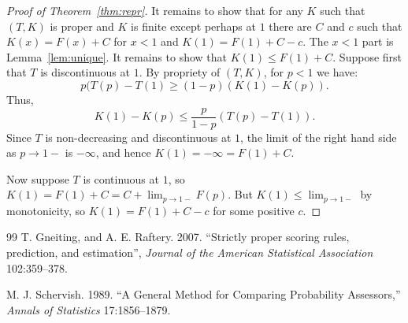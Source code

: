 \documentclass[11pt]{amsart} %
\begin{document}
\begin{proof}[Proof of Theorem~\ref{thm:repr}]
It remains to show that for any $K$ such that $(T,K)$ is proper and $K$ is finite except perhaps at $1$
there are $C$ and $c$ such that $K(x)=F(x)+C$ for $x<1$ and $K(1)=F(1)+C-c$. The $x<1$ part is 
Lemma~\ref{lem:unique}. It remains to show that $K(1)\le F(1)+C$. Suppose first that $T$ is discontinuous
at $1$. By propriety of $(T,K)$, for $p<1$ we have:
$$
	p (T(p)-T(1) \ge (1-p)(K(1)-K(p)).
$$
Thus,
$$
	K(1)-K(p) \le \frac{p}{1-p} (T(p)-T(1)).
$$
Since $T$ is non-decreasing and discontinuous at $1$, the limit of the right hand side as $p\to 1-$ is
$-\infty$, and hence $K(1)=-\infty=F(1)+C$. 

Now suppose $T$ is continuous at $1$, so $K(1)=F(1)+C=C+\lim_{p\to 1-} F(p)$. But
$K(1)\le \lim_{p\to 1-}$ by monotonicity, so $K(1)=F(1)+C-c$ for some positive $c$.
\end{proof}


\begin{thebibliography}{99}
T. Gneiting, and A. E. Raftery. 2007. ``Strictly proper scoring rules, prediction, and estimation'', \textit{Journal of the American
Statistical Association} 102:359--378.

M. J. Schervish. 1989. ``A General Method for Comparing Probability Assessors,''
\textit{Annals of Statistics} 17:1856–1879.

\end{thebibliography}
\end{document}
